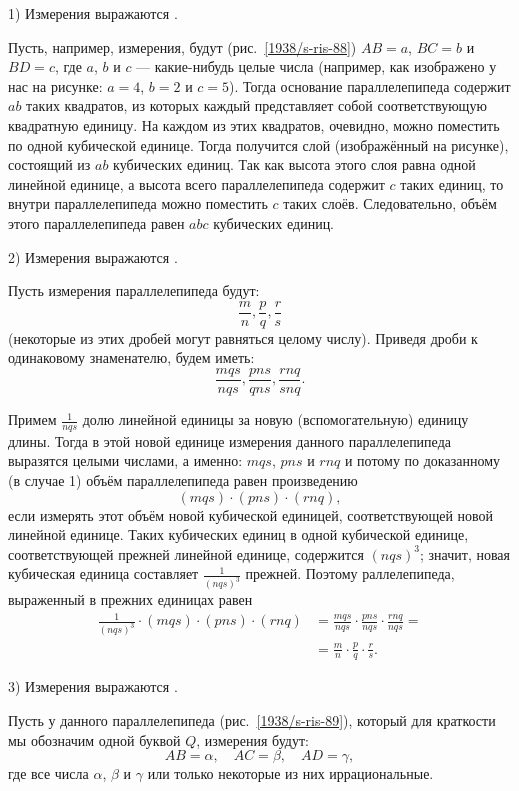 1) Измерения выражаются .

Пусть, например, измерения, будут (рис.~\ref{1938/s-ris-88}) $AB=a$, $BC=b$ и $BD=c$, где $a$, $b$ и $c$ — какие-нибудь целые числа (например, как изображено у нас на рисунке: $a=4$, $b=2$ и $c=5$).
Тогда основание параллелепипеда содержит $ab$ таких квадратов, из которых каждый представляет собой соответствующую квадратную единицу.
На каждом из этих квадратов, очевидно, можно поместить по одной кубической единице.
Тогда получится слой (изображённый на рисунке), состоящий из $ab$ кубических единиц.
Так как высота этого слоя равна одной линейной единице, а высота всего параллелепипеда содержит $c$ таких единиц, то внутри параллелепипеда можно поместить $c$ таких слоёв.
Следовательно, объём этого параллелепипеда равен $abc$ кубических единиц.

2) Измерения выражаются .

Пусть измерения параллелепипеда будут:
\[\frac mn, \frac pq, \frac rs\]
(некоторые из этих дробей могут равняться целому числу).
Приведя дроби к одинаковому знаменателю, будем иметь:
\[\frac {mqs}{nqs}, \frac {pns}{qns}, \frac {rnq}{snq}.\]

Примем $\frac 1{nqs}$ долю линейной единицы за новую (вспомогательную) единицу длины.
Тогда в этой новой единице измерения данного параллелепипеда выразятся целыми числами, а именно: $mqs$, $pns$ и $rnq$
и потому по доказанному (в случае 1) объём параллелепипеда равен произведению
\[(mqs)\cdot (pns)\cdot (rnq),\]
 если измерять этот объём новой кубической единицей, соответствующей новой линейной единице.
Таких кубических единиц в одной кубической единице, соответствующей прежней линейной единице, содержится $(nqs)^3$; значит, новая кубическая единица составляет $\tfrac1{(nqs)^3}$ прежней.
Поэтому раллелепипеда, выраженный в прежних единицах равен
\begin{align*}\frac1{(nqs)^3}\cdot(mqs)\cdot (pns)\cdot (rnq)&=\frac{mqs}{nqs}\cdot \frac{pns}{nqs}\cdot \frac{rnq}{nqs}= 
\\&=\frac mn\cdot \frac pq\cdot \frac rs.
\end{align*}


3) Измерения выражаются .

Пусть у данного параллелепипеда (рис.~\ref{1938/s-ris-89}), который для краткости мы обозначим одной буквой $Q$, измерения будут:
\[AB=\alpha,\quad AC=\beta,\quad AD=\gamma,\]
где все числа $\alpha$, $\beta$ и $\gamma$ или только некоторые из них иррациональные.

